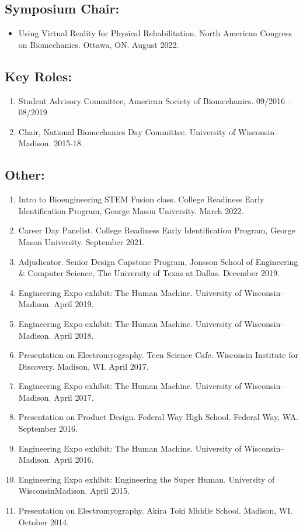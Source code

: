 \documentclass[letterpaper, 10pt]{article}
\begin{document}
\subsection{Symposium Chair:}
\begin{itemize}
     \item Using Virtual Reality for Physical Rehabilitation. North American Congress on Biomechanics. Ottawa, ON. August 2022.
\end{itemize}


\subsection{Key Roles:}
\begin{enumerate}
    \item Student Advisory Committee, American Society of Biomechanics. 09/2016 – 08/2019
    \item Chair, National Biomechanics Day Committee. University of Wisconsin--Madison. 2015-18.
\end{enumerate}

\subsection{Other:}
\begin{enumerate}
    \item Intro to Bioengineering STEM Fusion class. College Readiness Early Identiﬁcation Program, George Mason University. March 2022.
    \item Career Day Panelist. College Readiness Early Identiﬁcation Program, George Mason University. September 2021.
    \item Adjudicator. Senior Design Capstone Program, Jonsson School of Engineering \& Computer Science, The University of Texas at Dallas. December 2019.
    \item Engineering Expo exhibit: The Human Machine. University of Wisconsin--Madison. April 2019.
    \item Engineering Expo exhibit: The Human Machine. University of Wisconsin–Madison. April 2018.
    \item Presentation on Electromyography. Teen Science Cafe. Wisconsin Institute for Discovery. Madison, WI. April 2017.
    \item Engineering Expo exhibit: The Human Machine. University of Wisconsin--Madison. April 2017.
    \item Presentation on Product Design. Federal Way High School. Federal Way, WA. September 2016.
    \item Engineering Expo exhibit: The Human Machine. University of Wisconsin--Madison. April 2016.
    \item Engineering Expo exhibit: Engineering the Super Human. University of WisconsinMadison. April 2015.
    \item Presentation on Electromyography. Akira Toki Middle School. Madison, WI. October 2014.
\end{enumerate}
\end{document}
